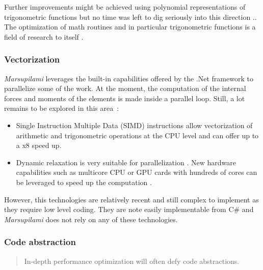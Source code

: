 Further improvements might be achieved using polynomial representations of trigonometric functions but no time was left to dig seriously into this direction \cite{Trefethen2007,Chevillard2010}.\cite{Green2003}. The optimization of math routines and in particular trigonometric functions is a field of research to itself \cite{Green2003}.

\subsubsection{Vectorization}
\emph{Marsupilami} leverages the built-in capabilities offered by the .Net framework to parallelize some of the work. At the moment, the computation of the internal forces and moments of the elements is made inside a parallel loop. Still, a lot remains to be explored in this area~:
\begin{itemize}
\item Single Instruction Multiple Data (SIMD) instructions allow vectorization of arithmetic and trigonometric operations at the CPU level and can offer up to a x8 speed up.
\item Dynamic relaxation is very suitable for parallelization \cite{Topping1994}. New hardware capabilities such as multicore CPU or GPU cards with hundreds of cores can be leveraged to speed up the computation \cite{Rek2016,Liew2016}.
\end{itemize}
However, this technologies are relatively recent and still complex to implement as they require low level coding. They are note easily implementable from C\# and \emph{Marsupilami} does not rely on any of these technologies.

\subsubsection{Code abstraction}
\blockcquote[p.~155]{Watson2014}{In-depth performance optimization will often defy code abstractions.}



